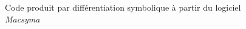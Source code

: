 \begin{figure}
\caption{Code produit par diff\'erentiation symbolique \`a partir du logiciel {\it Macsyma}}
\begin{center}
\end{center}
\label{fig:macsyma}
\end{figure}



